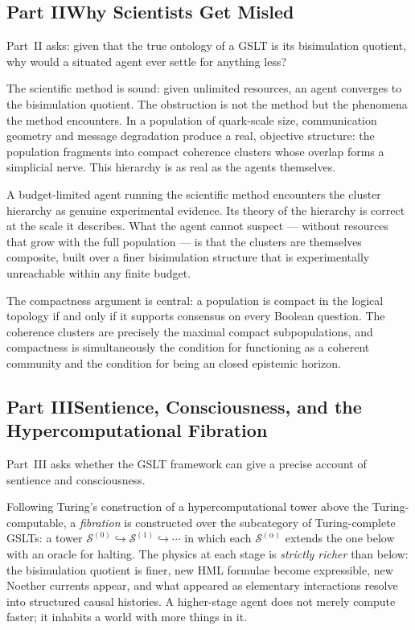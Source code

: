 \documentclass[12pt,openright,twoside]{book}
\theoremstyle{remark}
\newcommand{\GSLT}{\mathcal{S}}
\newcommand{\fiber}[1]{\GSLT^{(#1)}}
\begin{document}
\bigskip

\subsection*{Part II\quad Why Scientists Get Misled}

Part~II asks: given that the true ontology of a GSLT is its
bisimulation quotient, why would a situated agent ever settle
for anything less?

The scientific method is sound: given unlimited resources, an
agent converges to the bisimulation quotient.
The obstruction is not the method but the phenomena the method
encounters.
In a population of quark-scale size, communication geometry and
message degradation produce a real, objective structure: the
population fragments into compact coherence clusters whose overlap
forms a simplicial nerve.
This hierarchy is as real as the agents themselves.

A budget-limited agent running the scientific method encounters
the cluster hierarchy as genuine experimental evidence.
Its theory of the hierarchy is correct at the scale it describes.
What the agent cannot suspect --- without resources that grow with
the full population --- is that the clusters are themselves
composite, built over a finer bisimulation structure that is
experimentally unreachable within any finite budget.

The compactness argument is central: a population is compact in
the logical topology if and only if it supports consensus on every
Boolean question.
The coherence clusters are precisely the maximal compact
subpopulations, and compactness is simultaneously the condition
for functioning as a coherent community and the condition for
being an closed epistemic horizon.

\bigskip

\subsection*{Part III\quad Sentience, Consciousness, and the
Hypercomputational Fibration}

Part~III asks whether the GSLT framework can give a precise account
of sentience and consciousness.

Following Turing's construction of a hypercomputational tower above
the Turing-computable, a \emph{fibration} is constructed over the
subcategory of Turing-complete GSLTs: a tower
$\fiber{0} \hookrightarrow \fiber{1} \hookrightarrow \cdots$
in which each $\fiber{\alpha}$ extends the one below with an oracle
for halting.
The physics at each stage is \emph{strictly richer} than below:
the bisimulation quotient is finer, new HML formulae become
expressible, new Noether currents appear, and what appeared as
elementary interactions resolve into structured causal histories.
A higher-stage agent does not merely compute faster; it inhabits
a world with more things in it.
\end{document}
